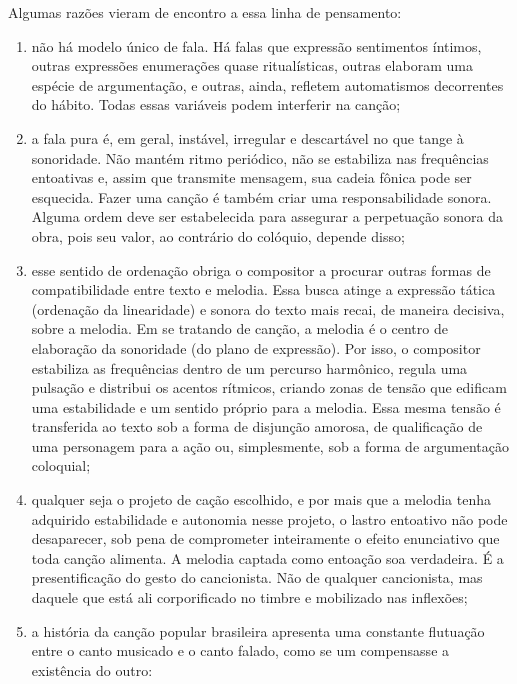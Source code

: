 Algumas razões vieram de encontro a essa linha de pensamento:

\begin{enumerate}[label=\alph*]
\item não há modelo único de fala. Há falas que expressão sentimentos
íntimos, outras expressões enumerações quase ritualísticas, outras
elaboram uma espécie de argumentação, e outras, ainda, refletem
automatismos decorrentes do hábito. Todas essas variáveis podem
interferir na canção;

\item a fala pura é, em geral, instável, irregular e descartável no que
tange à sonoridade. Não mantém ritmo periódico, não se estabiliza nas
frequências entoativas e, assim que transmite mensagem, sua cadeia
fônica pode ser esquecida. Fazer uma canção é também criar uma
responsabilidade sonora. Alguma ordem deve ser estabelecida para
assegurar a perpetuação sonora da obra, pois seu valor, ao contrário do
colóquio, depende disso;

\item esse sentido de ordenação obriga o compositor a procurar outras
formas de compatibilidade entre texto e melodia. Essa busca atinge a
expressão tática (ordenação da linearidade) e sonora do texto mais
recai, de maneira decisiva, sobre a melodia. Em se tratando de canção, a
melodia é o centro de elaboração da sonoridade (do plano de expressão).
Por isso, o compositor estabiliza as frequências dentro de um percurso
harmônico, regula uma pulsação e distribui os acentos rítmicos, criando
zonas de tensão que edificam uma estabilidade e um sentido próprio para
a melodia. Essa mesma tensão é transferida ao texto sob a forma de
disjunção amorosa, de qualificação de uma personagem para a ação ou,
simplesmente, sob a forma de argumentação coloquial;

\item qualquer seja o projeto de cação escolhido, e por mais que a melodia
tenha adquirido estabilidade e autonomia nesse projeto, o lastro
entoativo não pode desaparecer, sob pena de comprometer inteiramente o
efeito enunciativo que toda canção alimenta. A melodia captada como
entoação soa verdadeira. É a presentificação do gesto do cancionista.
Não de qualquer cancionista, mas daquele que está ali corporificado no
timbre e mobilizado nas inflexões;

\item a história da canção popular brasileira apresenta uma constante
flutuação entre o canto musicado e o canto falado, como se um
compensasse a existência do outro:


\end{enumerate}
